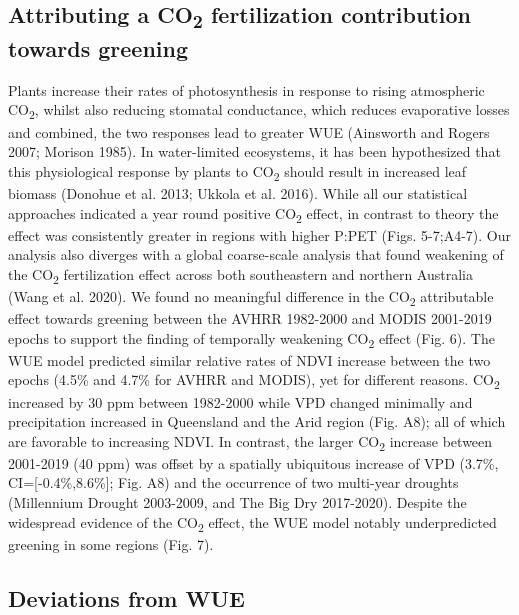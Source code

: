 \documentclass[
]{article}
\begin{document}
\hypertarget{attributing-a-co2-fertilization-contribution-towards-greening}{%
\subsection{\texorpdfstring{Attributing a CO\textsubscript{2}
fertilization contribution towards
greening}{Attributing a CO2 fertilization contribution towards greening}}\label{attributing-a-co2-fertilization-contribution-towards-greening}}

Plants increase their rates of photosynthesis in response to rising
atmospheric CO\textsubscript{2}, whilst also reducing stomatal
conductance, which reduces evaporative losses and combined, the two
responses lead to greater WUE (Ainsworth and Rogers 2007; Morison 1985).
In water-limited ecosystems, it has been hypothesized that this
physiological response by plants to CO\textsubscript{2} should result in
increased leaf biomass (Donohue et al. 2013; Ukkola et al. 2016). While
all our statistical approaches indicated a year round positive
CO\textsubscript{2} effect, in contrast to theory the effect was
consistently greater in regions with higher P:PET (Figs. 5-7;A4-7). Our
analysis also diverges with a global coarse-scale analysis that found
weakening of the CO\textsubscript{2} fertilization effect across both
southeastern and northern Australia (Wang et al. 2020). We found no
meaningful difference in the CO\textsubscript{2} attributable effect
towards greening between the AVHRR 1982-2000 and MODIS 2001-2019 epochs
to support the finding of temporally weakening CO\textsubscript{2}
effect (Fig. 6). The WUE model predicted similar relative rates of NDVI
increase between the two epochs (4.5\% and 4.7\% for AVHRR and MODIS),
yet for different reasons. CO\textsubscript{2} increased by 30 ppm
between 1982-2000 while VPD changed minimally and precipitation
increased in Queensland and the Arid region (Fig. A8); all of which are
favorable to increasing NDVI. In contrast, the larger
CO\textsubscript{2} increase between 2001-2019 (40 ppm) was offset by a
spatially ubiquitous increase of VPD (3.7\%, CI={[}-0.4\%,8.6\%{]}; Fig.
A8) and the occurrence of two multi-year droughts (Millennium Drought
2003-2009, and The Big Dry 2017-2020). Despite the widespread evidence
of the CO\textsubscript{2} effect, the WUE model notably underpredicted
greening in some regions (Fig. 7).

\hypertarget{deviations-from-wue}{%
\subsection{Deviations from WUE}\label{deviations-from-wue}}
\end{document}
